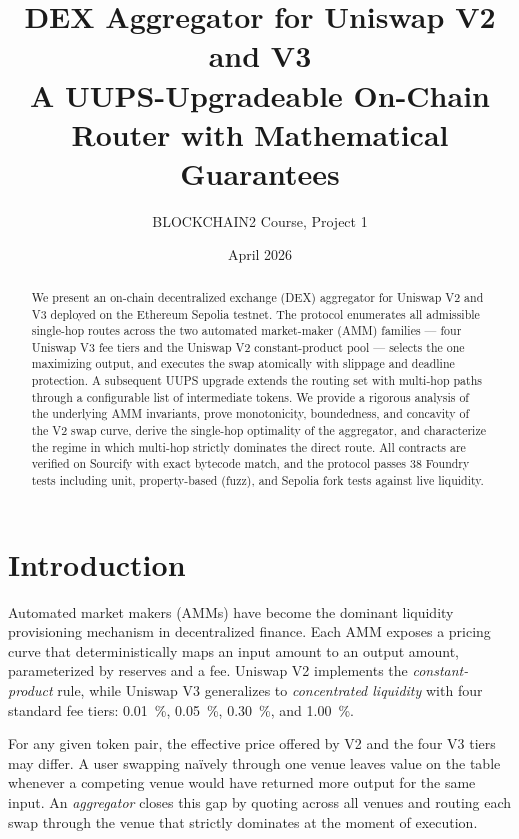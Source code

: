 \documentclass[11pt,a4paper]{article}
\title{
    \textbf{DEX Aggregator for Uniswap V2 and V3} \\[0.5em]
    \large A UUPS-Upgradeable On-Chain Router with Mathematical Guarantees
}
\author{BLOCKCHAIN2 Course, Project 1}
\date{April 2026}
\theoremstyle{definition}
\begin{document}
\maketitle

\begin{abstract}
\noindent
We present an on-chain decentralized exchange (DEX) aggregator for Uniswap V2 and V3
deployed on the Ethereum Sepolia testnet. The protocol enumerates all admissible
single-hop routes across the two automated market-maker (AMM) families --- four
Uniswap V3 fee tiers and the Uniswap V2 constant-product pool --- selects the one
maximizing output, and executes the swap atomically with slippage and deadline
protection. A subsequent UUPS upgrade extends the routing set with multi-hop paths
through a configurable list of intermediate tokens. We provide a rigorous analysis
of the underlying AMM invariants, prove monotonicity, boundedness, and concavity of
the V2 swap curve, derive the single-hop optimality of the aggregator, and
characterize the regime in which multi-hop strictly dominates the direct route.
All contracts are verified on Sourcify with exact bytecode match, and the protocol
passes 38 Foundry tests including unit, property-based (fuzz), and Sepolia fork
tests against live liquidity.
\end{abstract}

\tableofcontents

\section{Introduction}

Automated market makers (AMMs) have become the dominant liquidity provisioning
mechanism in decentralized finance. Each AMM exposes a pricing curve that
deterministically maps an input amount to an output amount, parameterized by
reserves and a fee. Uniswap V2 \cite{uniswapv2} implements the \emph{constant-product}
rule, while Uniswap V3 \cite{uniswapv3} generalizes to \emph{concentrated liquidity}
with four standard fee tiers: \SI{0.01}{\percent}, \SI{0.05}{\percent},
\SI{0.30}{\percent}, and \SI{1.00}{\percent}.

For any given token pair, the effective price offered by V2 and the four V3 tiers
may differ. A user swapping naïvely through one venue leaves value on the table
whenever a competing venue would have returned more output for the same input.
An \emph{aggregator} closes this gap by quoting across all venues and routing each
swap through the venue that strictly dominates at the moment of execution.
\end{document}

